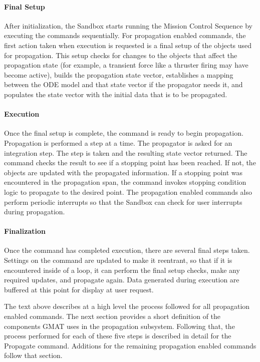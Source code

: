 \documentclass[11pt]{article}
\begin{document}
\paragraph{Final Setup}

After initialization, the Sandbox starts running the Mission Control Sequence by executing the commands sequentially.  For propagation enabled commands, the first action taken when execution is requested is a final setup of the objects used for propagation.  This setup checks for changes to the objects that affect the propagation state (for example, a transient force like a thruster firing may have become active), builds the propagation state vector, establishes a mapping between the ODE model and that state vector if the propagator needs it, and populates the state vector with the initial data that is to be propagated.

\paragraph{Execution}

Once the final setup is complete, the command is ready to begin propagation.  Propagation is performed a step at a time.  The propagator is asked for an integration step.  The step is taken and the resulting state vector returned.  The command checks the result to see if a stopping point has been reached.  If not, the objects are updated with the propagated information.  If a stopping point was encountered in the propagation span, the command invokes stopping condition logic to propagate to the desired point.  The propagation enabled commands also perform periodic interrupts so that the Sandbox can check for user interrupts during propagation.

\paragraph{Finalization}

Once the command has completed execution, there are several final steps taken.  Settings on the command are updated to make it reentrant, so that if it is encountered inside of a loop, it can perform the final setup checks, make any required updates, and propagate again.  Data generated during execution are buffered at this point for display at user request.

The text above describes at a high level the process followed for all propagation enabled commands.  The next section provides a short definition of the components GMAT uses in the propagation subsystem.  Following that, the process performed for each of these five steps is described in detail for the Propagate command.  Additions for the remaining propagation enabled commands follow that section.
\end{document}
